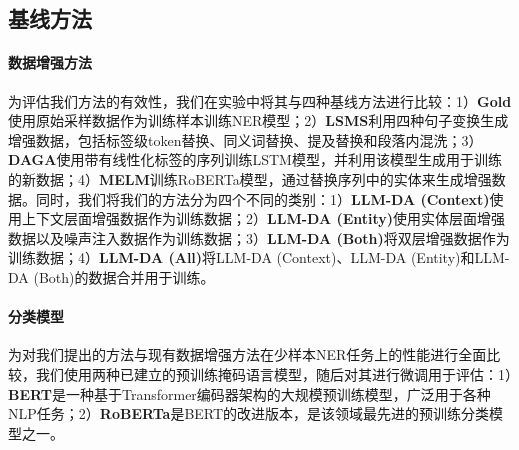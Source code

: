 \documentclass[supercite]{Experimental_Report}
\theoremstyle{definition}
\begin{document}
\subsection{基线方法}

\paragraph{数据增强方法}
为评估我们方法的有效性，我们在实验中将其与四种基线方法进行比较：1）\textbf{Gold}使用原始采样数据作为训练样本训练NER模型；2）\textbf{LSMS}利用四种句子变换生成增强数据，包括标签级token替换、同义词替换、提及替换和段落内混洗；3）\textbf{DAGA}使用带有线性化标签的序列训练LSTM模型，并利用该模型生成用于训练的新数据；4）\textbf{MELM}训练RoBERTa模型，通过替换序列中的实体来生成增强数据。同时，我们将我们的方法分为四个不同的类别：1）\textbf{LLM-DA (Context)}使用上下文层面增强数据作为训练数据；2）\textbf{LLM-DA (Entity)}使用实体层面增强数据以及噪声注入数据作为训练数据；3）\textbf{LLM-DA (Both)}将双层增强数据作为训练数据；4）\textbf{LLM-DA (All)}将LLM-DA (Context)、LLM-DA (Entity)和LLM-DA (Both)的数据合并用于训练。

\paragraph{分类模型}
为对我们提出的方法与现有数据增强方法在少样本NER任务上的性能进行全面比较，我们使用两种已建立的预训练掩码语言模型，随后对其进行微调用于评估：1）\textbf{BERT}是一种基于Transformer编码器架构的大规模预训练模型，广泛用于各种NLP任务；2）\textbf{RoBERTa}是BERT的改进版本，是该领域最先进的预训练分类模型之一。

\begin{table}[!t]
    \centering
    \caption{不同方法在不同数据集上相对于``Gold''条目的增强率。}
    \label{table:aug-rate}
\end{table}
\end{document}
